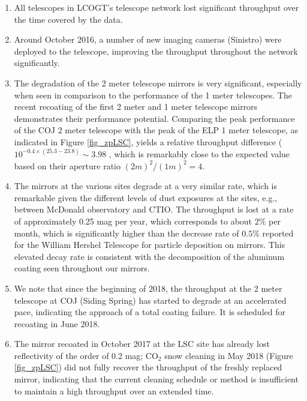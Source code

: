 \documentclass[]{spie}
\begin{document}
\begin{enumerate}
\item All telescopes in LCOGT's telescope network lost significant throughput over the time covered
 by the data. 

\item Around October 2016, a number of new imaging cameras (Sinistro) were deployed to the 
telescope, improving the throughput throughout the network significantly.

\item The degradation of the 2 meter telescope mirrors is very significant, especially when seen in
comparison to the performance of the 1 meter telescopes. The recent recoating of the first 2 meter
and 1 meter telescope mirrors demonstrates their  performance potential. Comparing the peak 
performance of the COJ 2 meter telescope with the peak of the ELP 1 meter telescope, as indicated 
in Figure \ref{fig_zpLSC}, yields a  relative throughput difference  ($10^{-0.4\times (25.3-23.8)} 
\sim 3.98$ , which is remarkably close to the expected value based on their aperture ratio 
$(2m)^2/(1m)^2 = 4$.

\item The mirrors at the various sites degrade at a very similar rate, which is remarkable given the
different levels of dust exposures at the sites, e.g., between McDonald observatory and CTIO. The
throughput is lost at a rate of approximately 0.25 mag per year, which corresponds to about $2 \%$
per month, which is significantly higher than the decrease rate of $0.5\%$ reported for the William
Hershel Telescope\cite{designolt,benn2000} for particle deposition on mirrors. This elevated decay
rate is  consistent with the decomposition of the aluminum coating seen throughout our mirrors.

\item We note that since the beginning of 2018, the throughput at the 2 meter telescope at COJ 
(Siding Spring) has started to degrade at an accelerated pace, indicating the approach of a total 
coating failure. It is scheduled for recoating in June 2018.

\item The  mirror recoated in October 2017 at the LSC site has already lost reflectivity of the
 order of 0.2 mag; CO$_2$ snow cleaning in May 2018 (Figure \ref{fig_zpLSC}) did not fully recover
 the throughput of the freshly replaced mirror,  indicating that the current cleaning schedule or
 method is insufficient to maintain a high throughput over an extended time.

\end{enumerate}
\end{document}
